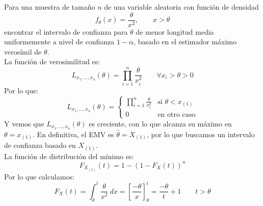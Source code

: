 \begin{ejercicio} %
    Para una muestra de tamaño $n$ de una variable aleatoria con función de densidad
    \begin{equation*}
        f_\theta(x) = \frac{\theta}{x^2}, \qquad x>\theta
    \end{equation*}
    encontrar el intervalo de confianza para $\theta$ de menor longitud media uniformemente a nivel de confianza $1 - \alpha$, basado en el estimador máximo verosímil de $\theta$.\\

    \noindent
    La función de verosimilitud es:
    \begin{equation*}
        L_{x_1,\ldots,x_n}(\theta) = \prod_{i=1}^{n} \frac{\theta}{x_i^2} \qquad \forall x_i > \theta > 0
    \end{equation*}
    Por lo que:
    \begin{equation*}
        L_{x_1,\ldots,x_n}(\theta) = \left\{\begin{array}{ll}
            \prod\limits_{i=1}^{n}\frac{\theta}{x_i^2} & \text{si\ } \theta < x_{(1)}  \\
             0 & \text{en otro caso} 
        \end{array}\right. 
    \end{equation*}
    Y vemos que $L_{x_1,\ldots,x_n}(\theta)$ es creciente, con lo que alcanza su máximo en $\theta = x_{(1)}$. En definitiva, el EMV es $\hat{\theta} = X_{(1)}$, por lo que buscamos un intervalo de confianza basado en $X_{(1)}$.\\

    \noindent
    La función de distribución del mínimo es:
    \begin{equation*}
        F_{X_{(1)}}(t) = 1-{(1-F_X(t))}^{n}
    \end{equation*}
    Por lo que calculamos:
    \begin{equation*}
        F_X(t) = \int_{\theta}^{t} \frac{\theta}{x^2}~dx  = \left[\frac{-\theta}{x}\right]_\theta^t = \frac{-\theta}{t} + 1 \qquad t>\theta
    \end{equation*}


\end{ejercicio}
